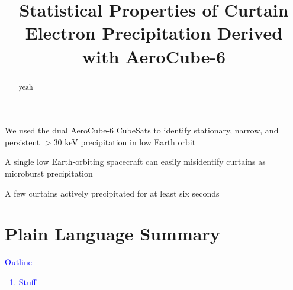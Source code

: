 \documentclass[draft]{agujournal2019}
\begin{document}
\title{Statistical Properties of Curtain Electron Precipitation Derived with AeroCube-6}

%
%





\begin{keypoints}
\item We used the dual AeroCube-6 CubeSats to identify stationary, narrow, and persistent $>30$ keV precipitation in low Earth orbit
\item A single low Earth-orbiting spacecraft can easily misidentify curtains as microburst precipitation
\item A few curtains actively precipitated for at least six seconds
\end{keypoints}

%
%


\begin{abstract}
yeah
\end{abstract}

\section{Plain Language Summary}
\textcolor{blue}{
Outline
\begin{enumerate}
\item Stuff
\end{enumerate}
}
\end{document}
